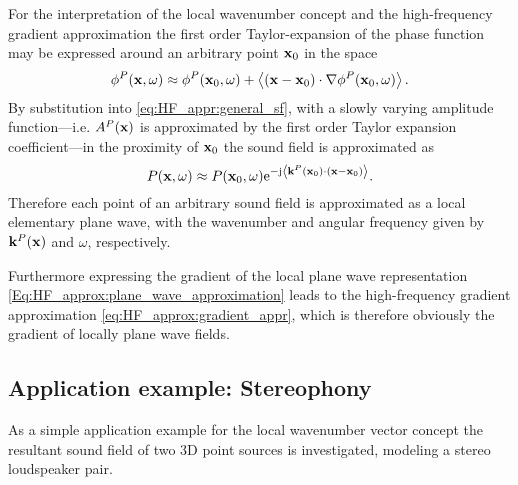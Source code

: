 \vspace{3mm}
For the interpretation of the local wavenumber concept and the high-frequency gradient approximation the first order Taylor-expansion of the phase function may be expressed around an arbitrary point $\mathbf{x}_0$ in the space
\begin{equation}
\phi^P(\mathbf{x},\omega) \approx \phi^P(\mathbf{x}_0,\omega) + \left< (\mathbf{x}-\mathbf{x}_0) \cdot \nabla \phi^P(\mathbf{x}_0,\omega) \right>.
\end{equation}
By substitution into \eqref{eq:HF_appr:general_sf}, with a slowly varying amplitude function---i.e. $A^P(\mathbf{x})$ is approximated by the first order Taylor expansion coefficient---in the proximity of $\mathbf{x}_0$ the sound field is approximated as
\begin{equation}
\label{Eq:HF_approx:plane_wave_approximation}
P(\mathbf{x},\omega) \approx P(\mathbf{x}_0,\omega) \mathrm{e}^{-\mathrm{j}  \left< \mathbf{k}^P(\mathbf{x}_0) \cdot \left( \mathbf{x} - \mathbf{x}_0 \right) \right>}.
\end{equation}
Therefore each point of an arbitrary sound field is approximated as a local elementary plane wave, with the wavenumber and angular frequency given by $\mathbf{k}^P(\mathbf{x})$ and $\omega$, respectively.

Furthermore expressing the gradient of the local plane wave representation \eqref{Eq:HF_approx:plane_wave_approximation} leads to the high-frequency gradient approximation \eqref{eq:HF_approx:gradient_appr}, which is therefore obviously the gradient of locally plane wave fields.

\subsection*{Application example: Stereophony}

As a simple application example for the local wavenumber vector concept the resultant sound field of two 3D point sources is investigated, modeling a stereo loudspeaker pair.

